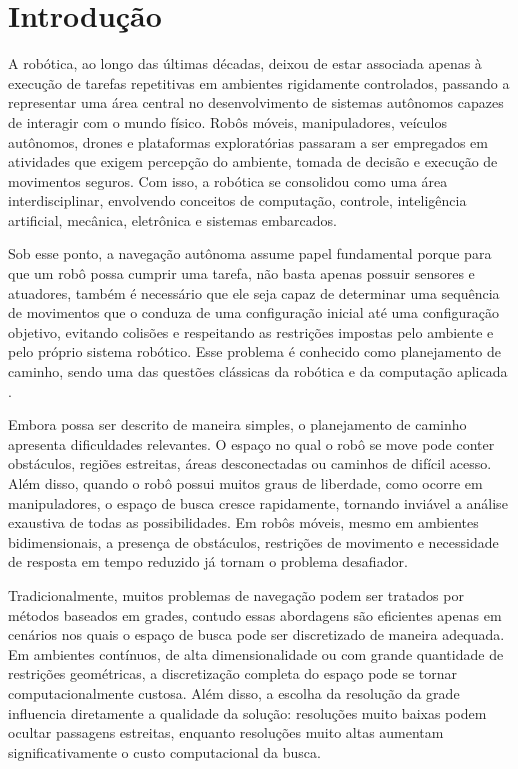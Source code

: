 \chapter{Introdução}\label{cap:introducao}

A robótica, ao longo das últimas décadas, deixou de estar associada apenas à execução de tarefas repetitivas em ambientes rigidamente controlados, passando a representar uma área central no desenvolvimento de sistemas autônomos capazes de interagir com o mundo físico. Robôs móveis, manipuladores, veículos autônomos, drones e plataformas exploratórias passaram a ser empregados em atividades que exigem percepção do ambiente, tomada de decisão e execução de movimentos seguros. Com isso, a robótica se consolidou como uma área interdisciplinar, envolvendo conceitos de computação, controle, inteligência artificial, mecânica, eletrônica e sistemas embarcados. %

Sob esse ponto, a navegação autônoma assume papel fundamental porque para que um robô possa cumprir uma tarefa, não basta apenas possuir sensores e atuadores, também é necessário que ele seja capaz de determinar uma sequência de movimentos que o conduza de uma configuração inicial até uma configuração objetivo, evitando colisões e respeitando as restrições impostas pelo ambiente e pelo próprio sistema robótico. Esse problema é conhecido como planejamento de caminho, sendo uma das questões clássicas da robótica e da computação aplicada \citep{lavalle2006planning}.

Embora possa ser descrito de maneira simples, o planejamento de caminho apresenta dificuldades relevantes. O espaço no qual o robô se move pode conter obstáculos, regiões estreitas, áreas desconectadas ou caminhos de difícil acesso. Além disso, quando o robô possui muitos graus de liberdade, como ocorre em manipuladores, o espaço de busca cresce rapidamente, tornando inviável a análise exaustiva de todas as possibilidades. Em robôs móveis, mesmo em ambientes bidimensionais, a presença de obstáculos, restrições de movimento e necessidade de resposta em tempo reduzido já tornam o problema desafiador.

Tradicionalmente, muitos problemas de navegação podem ser tratados por métodos baseados em grades, contudo essas abordagens são eficientes apenas em cenários nos quais o espaço de busca pode ser discretizado de maneira adequada. Em ambientes contínuos, de alta dimensionalidade ou com grande quantidade de restrições geométricas, a discretização completa do espaço pode se tornar computacionalmente custosa. Além disso, a escolha da resolução da grade influencia diretamente a qualidade da solução: resoluções muito baixas podem ocultar passagens estreitas, enquanto resoluções muito altas aumentam significativamente o custo computacional da busca.


